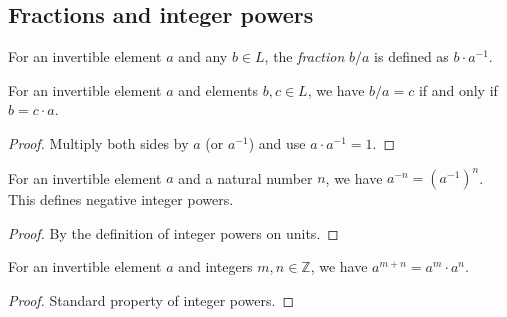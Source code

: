 \subsection{Fractions and integer powers}

\begin{definition}
\label{def.commring.fraction}
\leanhelper
\leanok
For an invertible element $a$ and any $b \in L$,
the \emph{fraction} $b/a$ is defined as $b \cdot a^{-1}$.
\end{definition}

\begin{lemma}
\label{lem.commring.fraction-eq-iff}
\leanhelper
\leanok
For an invertible element $a$ and elements $b, c \in L$, we have $b / a = c$ if and only if
$b = c \cdot a$.
\end{lemma}

\begin{proof}
\leanok
Multiply both sides by $a$ (or $a^{-1}$) and use $a \cdot a^{-1} = 1$.
\end{proof}

\begin{lemma}
\label{lem.commring.unit-zpow-neg}
\leanhelper
\leanok
For an invertible element $a$ and a natural number $n$, we have $a^{-n} = (a^{-1})^n$.
This defines negative integer powers.
\end{lemma}

\begin{proof}
\leanok
By the definition of integer powers on units.
\end{proof}

\begin{lemma}
\label{lem.commring.unit-zpow-add}
\leanhelper
\leanok
For an invertible element $a$ and integers $m, n \in \mathbb{Z}$, we have
$a^{m+n} = a^m \cdot a^n$.
\end{lemma}

\begin{proof}
\leanok
Standard property of integer powers.
\end{proof}
